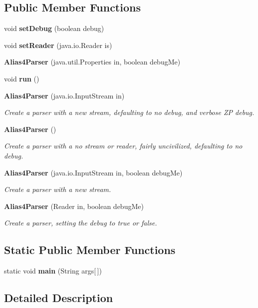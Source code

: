 \subsection*{Public Member Functions}
\begin{DoxyCompactItemize}
\item 
void {\bf set\+Debug} (boolean debug)
\item 
void {\bf set\+Reader} (java.\+io.\+Reader is)
\item 
{\bf Alias4\+Parser} (java.\+util.\+Properties in, boolean debug\+Me)
\item 
void {\bf run} ()
\item 
{\bf Alias4\+Parser} (java.\+io.\+Input\+Stream in)
\begin{DoxyCompactList}\small\item\em Create a parser with a new stream, defaulting to no debug, and verbose Z\+P debug. \end{DoxyCompactList}\item 
{\bf Alias4\+Parser} ()
\begin{DoxyCompactList}\small\item\em Create a parser with a no stream or reader, fairly uncivilized, defaulting to no debug. \end{DoxyCompactList}\item 
{\bf Alias4\+Parser} (java.\+io.\+Input\+Stream in, boolean debug\+Me)
\begin{DoxyCompactList}\small\item\em Create a parser with a new stream. \end{DoxyCompactList}\item 
{\bf Alias4\+Parser} (Reader in, boolean debug\+Me)
\begin{DoxyCompactList}\small\item\em Create a parser, setting the debug to true or false. \end{DoxyCompactList}\end{DoxyCompactItemize}
\subsection*{Static Public Member Functions}
\begin{DoxyCompactItemize}
\item 
static void {\bf main} (String args[$\,$])
\end{DoxyCompactItemize}


\subsection{Detailed Description}



